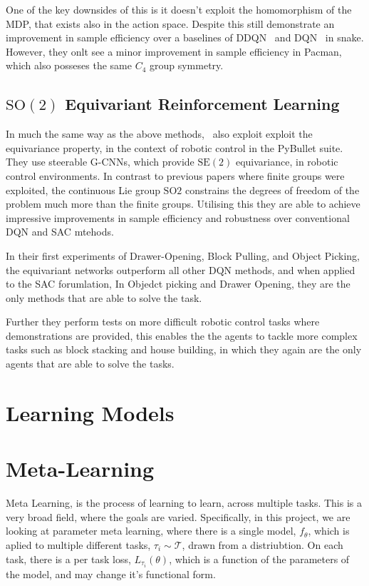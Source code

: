 One of the key downsides of this is it doesn't exploit the homomorphism of the MDP, that exists also in the action space. Despite this \cite{mondal2020group} still demonstrate an improvement in sample efficiency over a baselines of DDQN~\cite{van2016deep} and DQN~\cite{mnih2013playing} in snake. However, they onlt see a minor improvement in sample efficiency in Pacman, which also posseses the same $C_4$ group symmetry.

\subsection{$\mathrm{SO}(2)$ Equivariant Reinforcement Learning}

In much the same way as the above methods,~\cite{wang2022so2} also exploit exploit the equivariance property, in the context of robotic control in the PyBullet suite\cite{coumans2021}. They use steerable G-CNNs\cite{weiler2019general}, which provide $\text{SE}(2)$ equivariance, in robotic control environments. In contrast to previous papers where finite groups were exploited, the continuous Lie group $\text{SO}2$ constrains the degrees of freedom of the problem much more than the finite groups. Utilising this they are able to achieve impressive improvements in sample efficiency and robustness over conventional DQN and SAC mtehods.

In their first experiments of Drawer-Opening, Block Pulling, and Object Picking, the equivariant networks outperform all other DQN methods, and when applied to the SAC forumlation, In Objedct picking and Drawer Opening, they are the only methods that are able to solve the task.

Further they perform tests on more difficult robotic control tasks where demonstrations are provided, this enables the the agents to tackle more complex tasks such as block stacking and house building, in which they again are the only agents that are able to solve the tasks.

\section{Learning Models}
\section{Meta-Learning}
Meta Learning, is the process of learning to learn, across multiple tasks. This is a very broad field, where the goals are varied. Specifically, in this project, we are looking at parameter meta learning, where there is a single model, $f_\theta$, which is aplied to multiple different tasks, $\tau_i \sim \mathcal{T}$, drawn from a distriubtion.
On each task, there is a per task loss, $L_{\tau_i}(\theta)$, which is a function of the parameters of the model, and may change it's functional form.


